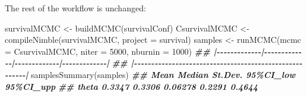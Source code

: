 \documentclass[
  12pt,
]{krantz}
\newenvironment{Shaded}{\begin{snugshade}}{\end{snugshade}}
\newcommand{\AttributeTok}[1]{\textcolor[rgb]{0.77,0.63,0.00}{#1}}
\newcommand{\CommentTok}[1]{\textcolor[rgb]{0.56,0.35,0.01}{\textit{#1}}}
\newcommand{\DecValTok}[1]{\textcolor[rgb]{0.00,0.00,0.81}{#1}}
\newcommand{\DocumentationTok}[1]{\textcolor[rgb]{0.56,0.35,0.01}{\textbf{\textit{#1}}}}
\newcommand{\FloatTok}[1]{\textcolor[rgb]{0.00,0.00,0.81}{#1}}
\newcommand{\FunctionTok}[1]{\textcolor[rgb]{0.00,0.00,0.00}{#1}}
\newcommand{\NormalTok}[1]{#1}
\newcommand{\OtherTok}[1]{\textcolor[rgb]{0.56,0.35,0.01}{#1}}
\newcommand{\SpecialCharTok}[1]{\textcolor[rgb]{0.00,0.00,0.00}{#1}}
\newcommand{\StringTok}[1]{\textcolor[rgb]{0.31,0.60,0.02}{#1}}
\begin{document}
\begin{Shaded}
\end{Shaded}

The rest of the workflow is unchanged:

\begin{Shaded}
\begin{Highlighting}[]
\NormalTok{survivalMCMC }\OtherTok{\textless{}{-}} \FunctionTok{buildMCMC}\NormalTok{(survivalConf)}
\NormalTok{CsurvivalMCMC }\OtherTok{\textless{}{-}} \FunctionTok{compileNimble}\NormalTok{(survivalMCMC, }
                               \AttributeTok{project =}\NormalTok{ survival)}
\NormalTok{samples }\OtherTok{\textless{}{-}} \FunctionTok{runMCMC}\NormalTok{(}\AttributeTok{mcmc =}\NormalTok{ CsurvivalMCMC, }
                   \AttributeTok{niter =} \DecValTok{5000}\NormalTok{, }
                   \AttributeTok{nburnin =} \DecValTok{1000}\NormalTok{)}
\DocumentationTok{\#\# |{-}{-}{-}{-}{-}{-}{-}{-}{-}{-}{-}{-}{-}|{-}{-}{-}{-}{-}{-}{-}{-}{-}{-}{-}{-}{-}|{-}{-}{-}{-}{-}{-}{-}{-}{-}{-}{-}{-}{-}|{-}{-}{-}{-}{-}{-}{-}{-}{-}{-}{-}{-}{-}|}
\DocumentationTok{\#\# |{-}{-}{-}{-}{-}{-}{-}{-}{-}{-}{-}{-}{-}{-}{-}{-}{-}{-}{-}{-}{-}{-}{-}{-}{-}{-}{-}{-}{-}{-}{-}{-}{-}{-}{-}{-}{-}{-}{-}{-}{-}{-}{-}{-}{-}{-}{-}{-}{-}{-}{-}{-}{-}{-}{-}|}
\FunctionTok{samplesSummary}\NormalTok{(samples)}
\DocumentationTok{\#\#         Mean Median St.Dev. 95\%CI\_low 95\%CI\_upp}
\DocumentationTok{\#\# theta 0.3347 0.3306 0.06278    0.2291    0.4644}
\end{Highlighting}
\end{Shaded}
\end{document}
